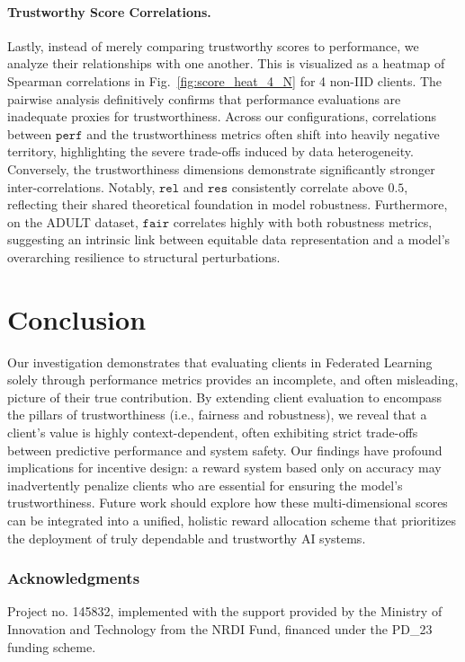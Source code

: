 \documentclass[sigconf]{acmart}
\begin{document}
\paragraph{Trustworthy Score Correlations. }

Lastly, instead of merely comparing trustworthy scores to performance, we analyze their relationships with one another. This is visualized as a heatmap of Spearman correlations in Fig.~\ref{fig:score_heat_4_N} for 4 non-IID clients. The pairwise analysis definitively confirms that performance evaluations are inadequate proxies for trustworthiness. Across our configurations, correlations between $\mathtt{perf}$ and the trustworthiness metrics often shift into heavily negative territory, highlighting the severe trade-offs induced by data heterogeneity. Conversely, the trustworthiness dimensions demonstrate significantly stronger inter-correlations. Notably, $\mathtt{rel}$ and $\mathtt{res}$ consistently correlate above $0.5$, reflecting their shared theoretical foundation in model robustness. Furthermore, on the ADULT dataset, $\mathtt{fair}$ correlates highly with both robustness metrics, suggesting an intrinsic link between equitable data representation and a model's overarching resilience to structural perturbations.

\section{Conclusion}
\label{sec:con}

Our investigation demonstrates that evaluating clients in Federated Learning solely through performance metrics provides an incomplete, and often misleading, picture of their true contribution. By extending client evaluation to encompass the pillars of trustworthiness (i.e., fairness and robustness), we reveal that a client's value is highly context-dependent, often exhibiting strict trade-offs between predictive performance and system safety. Our findings have profound implications for incentive design: a reward system based only on accuracy may inadvertently penalize clients who are essential for ensuring the model's trustworthiness. Future work should explore how these multi-dimensional scores can be integrated into a unified, holistic reward allocation scheme that prioritizes the deployment of truly dependable and trustworthy AI systems.

\subsubsection*{Acknowledgments}
Project no. 145832, implemented with the support provided by the Ministry of Innovation and Technology from the NRDI Fund, financed under the PD\_23 funding scheme. 



\end{document}
